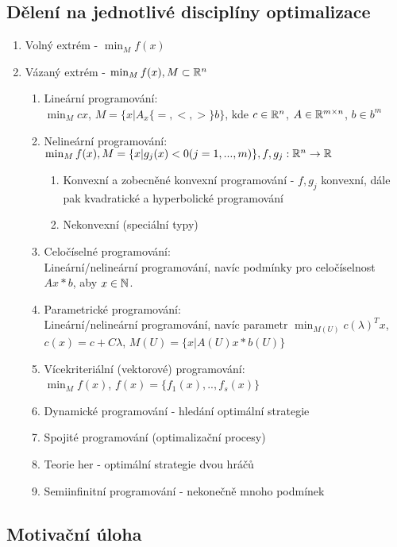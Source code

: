 \documentclass[a4paper,12pt,titlepage]{article}
\begin{document}
\subsection{Dělení na jednotlivé disciplíny optimalizace}
\setcounter{equation}{0}
\begin{enumerate}
	\item Volný extrém - $\min_M f(x)$
	\item Vázaný extrém - $\min_M f(x), M \subset \mathbb{R}^n$
	\begin{enumerate}
		\item Lineární programování: \\
			$\min_M cx$, $M = \{ x | A_x
			\{=,\lt,\gt\}
			b\}$, kde $c \in \mathbb{R}^n$, $A \in \mathbb{R}^{m \times n}$, $b \in b^m$
		\item Nelineární programování: \\
			$\min_M f(x), M = \{ x | g_j(x) < 0 (j = 1, ..., m) \}, f, g_j:
			\mathbb{R}^n \to \mathbb{R}$
			\begin{enumerate}
				\item Konvexní a zobecněné konvexní programování - $f,g_j$
				konvexní, dále pak kvadratické a hyperbolické programování
				\item Nekonvexní (speciální typy)
			\end{enumerate}
		\item Celočíselné programování: \\
			Lineární/nelineární programování, navíc podmínky pro celočíselnost
			$Ax * b$, aby $x \in \mathbb{N}$.
		\item Parametrické programování: \\
			Lineární/nelineární programování, navíc parametr $\min_{M(U)} c
			(\lambda)^T x$, $c(x) = c + C\lambda$, $M(U) = \{ x | A(U) x * b(U)
			\}$
		\item Vícekriteriální (vektorové) programování: \\
			$\min_M f(x)$, $f(x) = \{f_1(x), .., f_s(x)\}$
		\item Dynamické programování - hledání optimální strategie
		\item Spojité programování (optimalizační procesy)
		\item Teorie her - optimální strategie dvou hráčů
		\item Semiinfinitní programování - nekonečně mnoho podmínek
	\end{enumerate}
\end{enumerate}

\subsection{Motivační úloha}
\setcounter{equation}{0}
\end{document}
